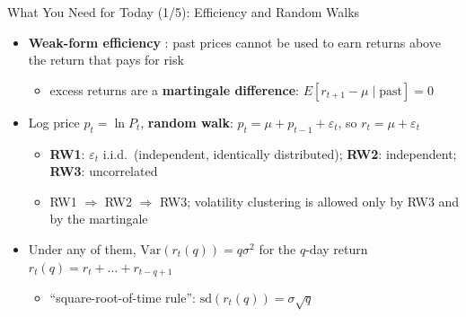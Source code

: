 \begin{frame}{What You Need for Today (1/5): Efficiency and Random Walks}
\itemsize{\small}
\begin{itemize}
    \item \textbf{Weak-form efficiency} : past prices cannot be used to earn returns above the return that pays for risk
    \begin{itemize}
        \item excess returns are a \textbf{martingale difference}: $E[r_{t+1} - \mu \mid \text{past}] = 0$
    \end{itemize}
    \item Log price $p_t = \ln P_t$, \textbf{random walk}: $p_t = \mu + p_{t-1} + \varepsilon_t$, so $r_t = \mu + \varepsilon_t$ 
    \begin{itemize}
        \item \textbf{RW1}: $\varepsilon_t$ i.i.d.\ (independent, identically distributed); \textbf{RW2}: independent; \textbf{RW3}: uncorrelated
        \item RW1 $\Rightarrow$ RW2 $\Rightarrow$ RW3; volatility clustering is allowed only by RW3 and by the martingale
    \end{itemize}
    \item Under any of them, $\mathrm{Var}(r_t(q)) = q\sigma^2$ for the $q$-day return $r_t(q) = r_t + \dots + r_{t-q+1}$
    \begin{itemize}
        \item ``square-root-of-time rule'': $\mathrm{sd}(r_t(q)) = \sigma\sqrt{q}$
    \end{itemize}
\end{itemize}
\end{frame}

